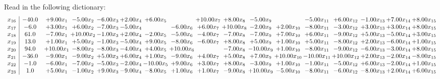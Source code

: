 \documentclass[9pt]{article}
\begin{document}
Read in the following dictionary:
\[\begin{array}{c| c c@{\hskip 2pt} c@{\hskip 2pt} c@{\hskip 2pt} c@{\hskip 2pt} c@{\hskip 2pt} c@{\hskip 2pt} c@{\hskip 2pt} c@{\hskip 2pt} c@{\hskip 2pt} c@{\hskip 2pt} c@{\hskip 2pt} c@{\hskip 2pt} c@{\hskip 2pt} c@{\hskip 2pt} c@{\hskip 2pt} }
 x_{16}   &  -40.0 & +  9.00 x_{1} & -5.00 x_{2} & -6.00 x_{3} & +  2.00 x_{4} & +  6.00 x_{5} &   & + 10.00 x_{7} & +  8.00 x_{8} & -5.00 x_{9} &   & -5.00 x_{11} & +  6.00 x_{12} & -1.00 x_{13} & +  7.00 x_{14} & +  8.00 x_{15}\\
 x_{17}   &  -6.0 & +  3.00 x_{1} & +  6.00 x_{2} & -7.00 x_{3} & -5.00 x_{4} &   & -6.00 x_{6} & +  6.00 x_{7} & + 10.00 x_{8} & -2.00 x_{9} & +  2.00 x_{10} & -8.00 x_{11} & -3.00 x_{12} & +  3.00 x_{13} & +  3.00 x_{14} & +  8.00 x_{15}\\
 x_{18}   &  61.0 & -7.00 x_{1} & + 10.00 x_{2} & -1.00 x_{3} & +  2.00 x_{4} & -2.00 x_{5} & -5.00 x_{6} & -4.00 x_{7} & -7.00 x_{8} & -7.00 x_{9} & +  7.00 x_{10} & +  6.00 x_{11} & -9.00 x_{12} & +  5.00 x_{13} & -5.00 x_{14} & +  3.00 x_{15}\\
 x_{19}   &  13.0 & +  1.00 x_{1} & +  5.00 x_{2} & -1.00 x_{3} & -5.00 x_{4} & +  9.00 x_{5} & -8.00 x_{6} & -6.00 x_{7} & +  8.00 x_{8} & +  5.00 x_{9} & +  1.00 x_{10} & +  5.00 x_{11} & -8.00 x_{12} & +  2.00 x_{13} & -6.00 x_{14} & +  1.00 x_{15}\\
 x_{20}   &  94.0 & + 10.00 x_{1} & -8.00 x_{2} & -8.00 x_{3} & -4.00 x_{4} & +  4.00 x_{5} & + 10.00 x_{6} &   & -7.00 x_{8} & -10.00 x_{9} & +  1.00 x_{10} & -8.00 x_{11} & -9.00 x_{12} & -6.00 x_{13} & -3.00 x_{14} & +  8.00 x_{15}\\
 x_{21}   &  -36.0 & -9.00 x_{1} & -9.00 x_{2} & +  5.00 x_{3} & +  6.00 x_{4} & +  1.00 x_{5} & -9.00 x_{6} & +  4.00 x_{7} & +  5.00 x_{8} & +  7.00 x_{9} & + 10.00 x_{10} & -10.00 x_{11} & + 10.00 x_{12} & +  2.00 x_{13} & -2.00 x_{14} & -8.00 x_{15}\\
 x_{22}   &  -1.0 & -6.00 x_{1} & -7.00 x_{2} & -5.00 x_{3} & -2.00 x_{4} & -10.00 x_{5} & +  9.00 x_{6} & +  3.00 x_{7} & +  8.00 x_{8} & -3.00 x_{9} & +  1.00 x_{10} & -1.00 x_{11} & -5.00 x_{12} & +  6.00 x_{13} & -2.00 x_{14} & +  1.00 x_{15}\\
 x_{23}   &  1.0 & +  5.00 x_{1} & -1.00 x_{2} & +  9.00 x_{3} & -9.00 x_{4} & -8.00 x_{5} & +  1.00 x_{6} & +  1.00 x_{7} & -9.00 x_{8} & + 10.00 x_{9} & -5.00 x_{10} & -8.00 x_{11} & -6.00 x_{12} & -8.00 x_{13} & +  2.00 x_{14} & +  6.00 x_{15}\\

\end{array}\]
\end{document}
